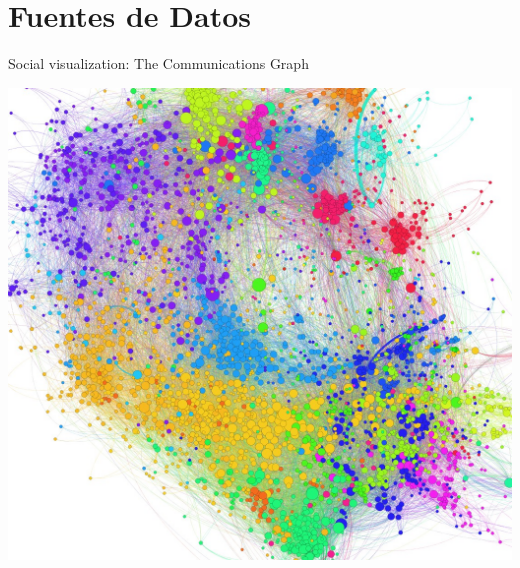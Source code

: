 \documentclass{beamer}
\begin{document}
%


\section{Fuentes de Datos}


\begin{frame}{Social visualization: The Communications Graph}

	\center
	\includegraphics[width = 1.0 \textwidth, trim = 0 0 0 0cm , clip = true]
	{slides/Graph-screenshot.jpg}

\end{frame}
\end{document}
